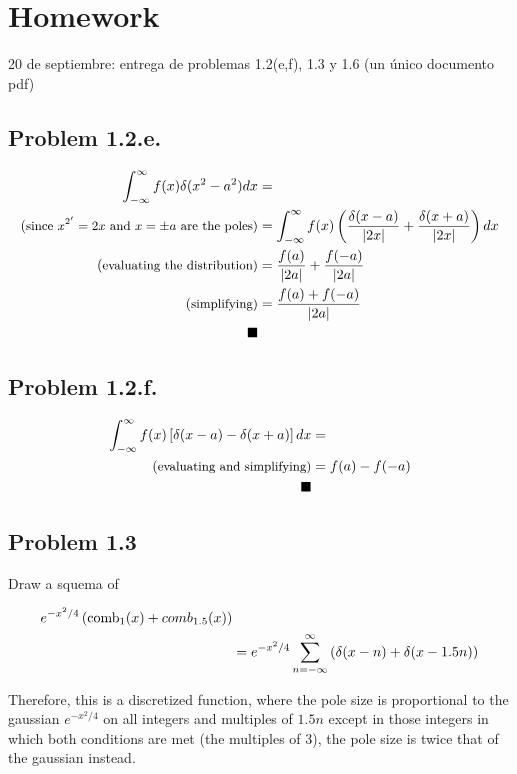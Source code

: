\documentclass[../main/main.tex]{subfiles}
\begin{document}
\section{Homework}

20 de septiembre: entrega de problemas 1.2(e,f), 1.3 y 1.6 (un único documento pdf)
\subsection*{Problem 1.2.e.}

\begin{align*}
\int _{-\infty}^{\infty}f(x) \delta (x^{2} - a^{2}) d x  &= \\
\textrm{(\small since $x^{2'} = 2x$ and $x=\pm a$ are the poles)}
	&= \int _{-\infty}^{\infty}f(x)\left( \frac{\delta (x-a)}{|2x|} + \frac{\delta(x+a)}{|2x|}\right) d x\\
\textrm{(\small evaluating the distribution)}
	&=\frac{f(a)}{|2a|} + \frac{f(-a)}{|2a|}\\
\textrm{(\small simplifying)}
	&= \frac{f(a) + f(-a)}{|2a|}\\ \qed
\end{align*}

\subsection*{Problem 1.2.f.}

\begin{align*}
\int _{-\infty}^{\infty}f(x) \left[\delta(x-a) - \delta(x+a)\right]d x  &= \\
\textrm{(\small evaluating and simplifying)}
	&=f(a) - f(-a) \\
	\qed
\end{align*}

\pagebreak
\subsection*{Problem 1.3}

Draw a squema of

\begin{align*}
e^{-x^{2}/4}\left(\textrm{comb}_{1}(x) + comb_{1.5}(x)\right)&\\
&=e^{-x^{2}/4}\sum_{n=-\infty}^{\infty}\left(\delta(x-n) +\delta(x-1.5n)\right)
\end{align*}

Therefore, this is a discretized function, where the pole size is proportional to the gaussian  $e^{-x^{2}/4}$ on all integers and multiples of $1.5n$ except in those integers in which both conditions are met (the multiples of 3), the pole size is twice that of the gaussian instead.
\end{document}
